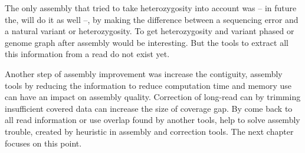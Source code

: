 \documentclass[main]{subfiles}
\begin{document}
The only assembly that tried to take heterozygosity into account was  – in future the, \shasta will do it as well –, by making the difference between a sequencing error and a natural variant or heterozygosity. To get heterozygosity and variant phased or genome graph after assembly would be interesting. But the tools to extract all this information from a read do not exist yet.

Another step of assembly improvement was increase the contiguity, assembly tools by reducing the information to reduce computation time and memory use can have an impact on assembly quality. Correction of long-read can by trimming insufficient covered data can increase the size of coverage gap.
By come back to all read information or use overlap found by another tools, help to solve assembly trouble, created by heuristic in assembly and correction tools. The next chapter focuses on this point.


\end{document}

